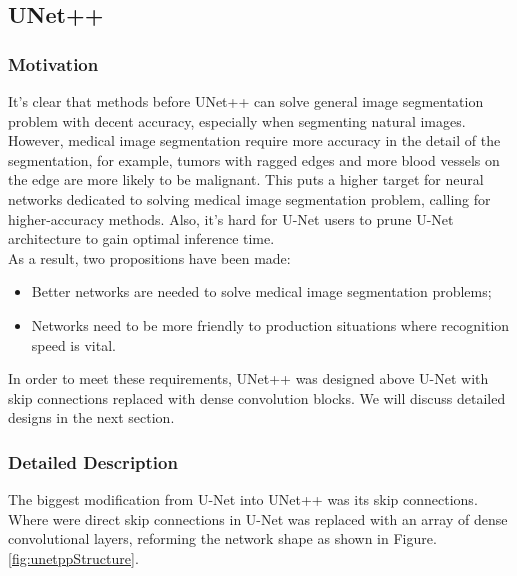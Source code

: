 \subsection{UNet++}
\subsubsection{Motivation}
It's clear that methods before UNet++\cite{unet_pp} can solve general image segmentation problem with decent accuracy, especially when segmenting natural images. However, medical image segmentation require more accuracy in the detail of the segmentation, for example, tumors with ragged edges and more blood vessels on the edge are more likely to be malignant. This puts a higher target for neural networks dedicated to solving medical image segmentation problem, calling for higher-accuracy methods. Also, it's hard for U-Net users to prune U-Net architecture to gain optimal inference time.\\
As a result, two propositions have been made:
\begin{itemize}
    \item Better networks are needed to solve medical image segmentation problems;
    \item Networks need to be more friendly to production situations where recognition speed is vital.
\end{itemize}
In order to meet these requirements, UNet++ was designed above U-Net\cite{unet} with skip connections replaced with dense convolution blocks. We will discuss detailed designs in the next section.

\subsubsection{Detailed Description}
The biggest modification from U-Net into UNet++ was its skip connections. Where were direct skip connections in U-Net was replaced with an array of dense convolutional layers, reforming the network shape as shown in Figure.\ref{fig:unetppStructure}.

